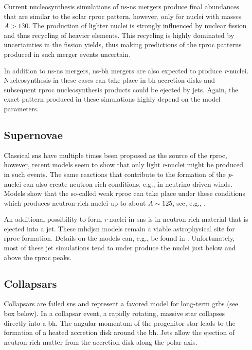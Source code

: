 Current nucleosynthesis simulations of \ac{ns}-\ac{ns} mergers produce final abundances that are similar to the solar \ac{rproc} pattern, however, only for nuclei with masses $A>130$. The production of lighter nuclei is strongly influenced by nuclear fission and thus recycling of heavier elements. This recycling is highly dominated by uncertainties in the fission yields, thus making predictions of the \ac{rproc} patterns produced in such merger events uncertain.

In addition to \ac{ns}-\ac{ns} mergers, \ac{ns}-\ac{bh} mergers are also expected to produce \textit{r}-nuclei. Nucleosynthesis in these cases can take place in \ac{bh} accretion disks and subsequent \ac{rproc} nucleosynthesis products could be ejected by jets. Again, the exact pattern produced in these simulations highly depend on the model parameters.

\subsection{Supernovae} \label{sec:r-process:astrophysical_sites:supernovae}

Classical \acp{sn} have multiple times been proposed as the source of the \ac{rproc}, however, recent models seem to show that only light \textit{r}-nuclei might be produced in such events. The same reactions that contribute to the formation of the \textit{p}-nuclei can also create neutron-rich conditions, e.g., in neutrino-driven winds. Models show that the so-called weak \ac{rproc} can take place under these conditions which produces neutron-rich nuclei up to about $A\sim125$, see, e.g., \citet{shibagaki16}.

An additional possibility to form \textit{r}-nuclei in \acp{sn} is in neutron-rich material that is ejected into a jet. These \ac{mhdjsn} models remain a viable astrophysical site for \ac{rproc} formation. Details on the models can, e.g., be found in \citet{winteler12}. Unfortunately, most of these jet simulations tend to under produce the nuclei just below and above the \ac{rproc} peaks.

\subsection{Collapsars}
Collapsars are failed \acp{sn} and represent a favored model for long-term \acp{grb} (see box below). In a collapsar event, a rapidly rotating, massive star collapses directly into a \ac{bh}. The angular momentum of the progenitor star leads to the formation of a heated accretion disk around the \ac{bh}. Jets allow the ejection of neutron-rich matter from the accretion disk along the polar axis. 

